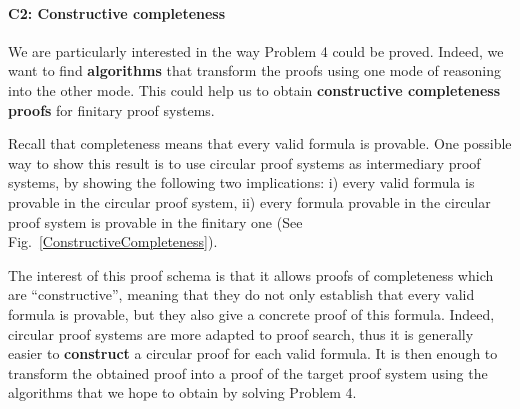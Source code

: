 \documentclass[11pt,twocolumn]{article}
\begin{document}
\paragraph{C2: Constructive completeness}

We are particularly interested in the way Problem 4 could be proved.
Indeed, we want to find \textbf{algorithms} that transform the proofs using one mode of reasoning into the other mode. This could help us to obtain \textbf{constructive completeness proofs} for finitary proof systems.


Recall that completeness means that every valid formula is provable. One possible way to show this result is to use circular proof systems as intermediary proof systems, by showing the following two implications:
i) every valid formula is provable in the circular proof system, ii) every formula provable in the circular proof system is provable in the finitary one (See Fig.~\ref{ConstructiveCompleteness}).

\begin{figure*}
  \begin{flushleft}
\end{flushleft}
\caption{Schema of constructive proof of completeness  \label{ConstructiveCompleteness}}
\end{figure*}

The interest of this proof schema is that it allows proofs of completeness which are ``constructive'', meaning that they do not only establish that every valid formula is provable, but they also give a concrete proof of this formula. Indeed, circular proof systems are more adapted to proof search, thus it is generally easier to  \textbf{construct}
a circular proof for each valid formula. It is then enough to transform the obtained proof into a proof of the target proof system using the algorithms that we hope to obtain by solving Problem 4.
\end{document}
